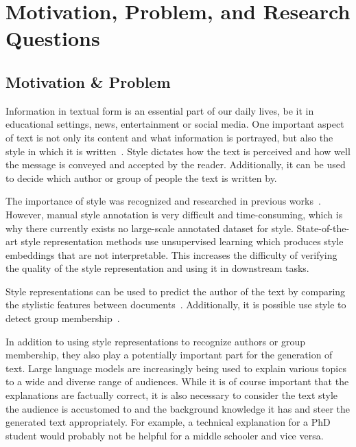 
\section{Motivation, Problem, and Research Questions}

\subsection{Motivation \& Problem}
Information in textual form is an essential part of our daily lives, be it in educational settings, news, entertainment or social media. One important aspect of text is not only its content and what information is portrayed, but also the style in which it is written~\cite{wegmannSameAuthorJust2022}. Style dictates how the text is perceived and how well the message is conveyed and accepted by the reader. Additionally, it can be used to decide which author or group of people the text is written by.

The importance of style was recognized and researched in previous works~\cite{zhu-etal-2024-styleflow, ijcai2020p526,wegmannSameAuthorJust2022}. However, manual style annotation is very difficult and time-consuming, which is why there currently exists no large-scale annotated dataset for style. State-of-the-art style representation methods use unsupervised learning which produces style embeddings that are not interpretable. This increases the difficulty of verifying the quality of the style representation and using it in downstream tasks.

Style representations can be used to predict the author of the text by comparing the stylistic features between documents~\cite{alshomaryLatentSpaceInterpretation2024}. Additionally, it is possible use style to detect group membership~\cite{10.1007/978-3-642-29047-3_27}. %

In addition to using style representations to recognize authors or group membership, they also play a potentially important part for the generation of text. Large language models are increasingly being used to explain various topics to a wide and diverse range of audiences. While it is of course important that the explanations are factually correct, it is also necessary to consider the text style the audience is accustomed to and the background knowledge it has and steer the generated text appropriately. For example, a technical explanation for a PhD student would probably not be helpful for a middle schooler and vice versa.

